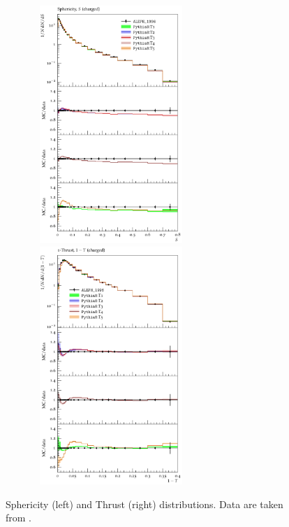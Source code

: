 \documentclass[aps,preprint,floatfix,nofootinbib,showpacs]{revtex4-1}
\begin{document}
 \begin{figure}[btp]
 \centering
 \includegraphics[width=8cm, height=9cm]{ALEPH_1996/d01-x01-y01.pdf}
 \hfill
  \includegraphics[width=8cm, height=9cm]{ALEPH_1996/d03-x01-y01.pdf}
  \caption{Sphericity (left) and Thrust (right) distributions. Data are taken from \cite{Barate:1996fi}.}
  \label{Fig-1}
 \end{figure} 
 
\end{document}
